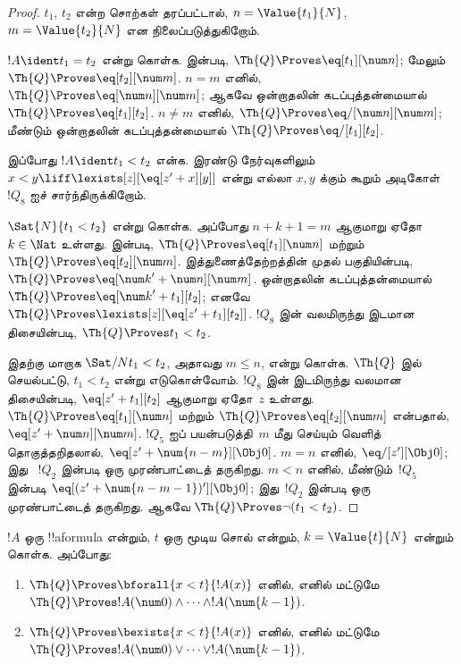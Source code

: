 \documentclass[../../../include/open-logic-section]{subfiles}
\begin{document}
\begin{proof}
$t_1$, $t_2$ என்ற சொற்கள் தரப்பட்டால்,
$n = \Value{t_1}{N}$, $m = \Value{t_2}{N}$ என நிலைப்படுத்துகிறோம்.

$!A \ident t_1 = t_2$ என்று கொள்க.
 இன்படி,
$\Th{Q} \Proves \eq[t_1][\num n]$;
மேலும் $\Th{Q} \Proves \eq[t_2][\num m]$.
$n = m$ எனில், $\Th{Q} \Proves \eq[\num n][\num m]$; ஆகவே
ஒன்றாதலின் கடப்புத்தன்மையால் $\Th{Q} \Proves \eq[t_1][t_2]$.
$n \neq m$ எனில், $\Th{Q} \Proves \eq/[\num n][\num m]$;
மீண்டும் ஒன்றாதலின் கடப்புத்தன்மையால்
$\Th{Q} \Proves \eq/[t_1][t_2]$.

இப்போது $!A \ident t_1 < t_2$ என்க. இரண்டு நேர்வுகளிலும்
$x < y \liff \lexists[z][\eq[z' + x][y]]$ என்று எல்லா $x,y$ க்கும்
கூறும் அடிகோள்~$!Q_8$ ஐச் சார்ந்திருக்கிறோம்.

$\Sat{N}{t_1 < t_2}$ என்று கொள்க. அப்போது
$n + k + 1 = m$ ஆகுமாறு ஏதோ $k \in \Nat$ உள்ளது.
 இன்படி,
$\Th{Q} \Proves \eq[t_1][\num n]$ மற்றும்
$\Th{Q} \Proves \eq[t_2][\num m]$.
இத்துணைத்தேற்றத்தின் முதல் பகுதியின்படி,
$\Th{Q} \Proves \eq[{\num k}' + \num n][\num m]$.
ஒன்றாதலின் கடப்புத்தன்மையால்
$\Th{Q} \Proves \eq[{\num k}' + t_1][t_2]$;
எனவே $\Th{Q} \Proves \lexists[z][\eq[z' + t_1][t_2]]$.
$!Q_8$ இன் வலமிருந்து இடமான திசையின்படி,
$\Th{Q} \Proves t_1 < t_2$.

இதற்கு மாறாக $\Sat/{N}{t_1 < t_2}$, அதாவது $m \leq n$, என்று கொள்க.
%
$\Th{Q}$ இல் செயல்பட்டு, $t_1 < t_2$ என்று எடுகொள்வோம்.
$!Q_8$ இன் இடமிருந்து வலமான திசையின்படி,
$\eq[z' + t_1][t_2]$ ஆகுமாறு ஏதோ~$z$ உள்ளது.
$\Th{Q} \Proves \eq[t_1][\num n]$ மற்றும்
$\Th{Q} \Proves \eq[t_2][\num m]$ என்பதால்,
$\eq[z' + \num n][\num m]$.
%
$!Q_5$ ஐப் பயன்படுத்தி~$m$ மீது செய்யும் வெளித் தொகுத்தறிதலால்,
$\eq[z' + \num{n - m}][\Obj 0]$.
$m = n$ எனில், $\eq/[z'][\Obj 0]$; இது
~$!Q_2$ இன்படி ஒரு முரண்பாட்டைத் தருகிறது.
$m < n$ எனில், மீண்டும்~$!Q_5$ இன்படி
$\eq[(z' + \num{n - m - 1})'][\Obj 0]$;
இது~$!Q_2$ இன்படி ஒரு முரண்பாட்டைத் தருகிறது.
ஆகவே $\Th{Q} \Proves \lnot(t_1 < t_2)$.
\end{proof}

\begin{lem}
$!A$ ஒரு !!a{formula} என்றும், $t$ ஒரு மூடிய சொல் என்றும்,
$k=\Value{t}{N}$ என்றும் கொள்க. அப்போது:
\begin{enumerate}
\item $\Th{Q} \Proves \bforall{x<t}{!A(x)}$ எனில், எனில் மட்டுமே
    $\Th{Q} \Proves !A(\num 0) \land \dots \land !A(\num{k-1})$.
\item $\Th{Q} \Proves \bexists{x<t}{!A(x)}$ எனில், எனில் மட்டுமே
    $\Th{Q} \Proves !A(\num 0) \lor \dots \lor !A(\num{k-1})$.
\end{enumerate}
\end{lem}
\end{document}
